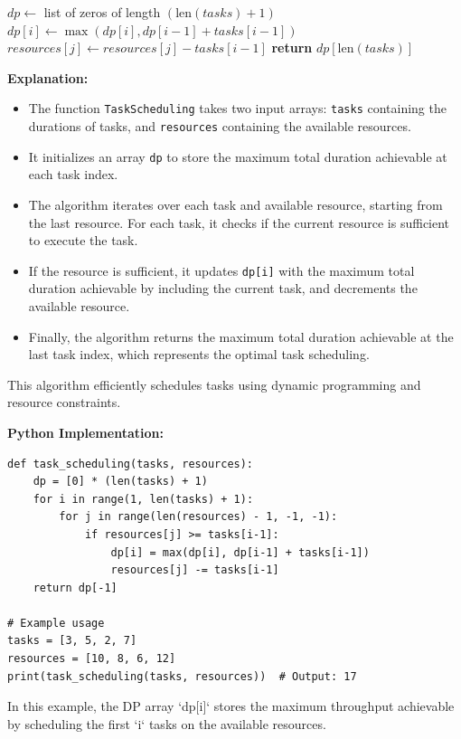 \documentclass[12pt]{book} %
\begin{document}
\begin{algorithm}
\caption{Task Scheduling}\label{task-scheduling}
\begin{algorithmic}[1]
    \State $dp \gets$ list of zeros of length $(\text{len}(tasks) + 1)$
                \State $dp[i] \gets \max(dp[i], dp[i-1] + tasks[i-1])$
                \State $resources[j] \gets resources[j] - tasks[i-1]$
            \EndIf
        \EndFor
    \EndFor
    \State \textbf{return} $dp[\text{len}(tasks)]$
\EndProcedure
\end{algorithmic}
\end{algorithm}
\FloatBarrier
\textbf{Explanation:}
\begin{itemize}
    \item The function \texttt{TaskScheduling} takes two input arrays: \texttt{tasks} containing the durations of tasks, and \texttt{resources} containing the available resources.
    \item It initializes an array \texttt{dp} to store the maximum total duration achievable at each task index.
    \item The algorithm iterates over each task and available resource, starting from the last resource. For each task, it checks if the current resource is sufficient to execute the task.
    \item If the resource is sufficient, it updates \texttt{dp[i]} with the maximum total duration achievable by including the current task, and decrements the available resource.
    \item Finally, the algorithm returns the maximum total duration achievable at the last task index, which represents the optimal task scheduling.
\end{itemize}

This algorithm efficiently schedules tasks using dynamic programming and resource constraints.

\textbf{Python Implementation:}
\FloatBarrier
\begin{lstlisting}
def task_scheduling(tasks, resources):
    dp = [0] * (len(tasks) + 1)
    for i in range(1, len(tasks) + 1):
        for j in range(len(resources) - 1, -1, -1):
            if resources[j] >= tasks[i-1]:
                dp[i] = max(dp[i], dp[i-1] + tasks[i-1])
                resources[j] -= tasks[i-1]
    return dp[-1]

# Example usage
tasks = [3, 5, 2, 7]
resources = [10, 8, 6, 12]
print(task_scheduling(tasks, resources))  # Output: 17
\end{lstlisting}
\FloatBarrier
In this example, the DP array `dp[i]` stores the maximum throughput achievable by scheduling the first `i` tasks on the available resources.
\end{document}
